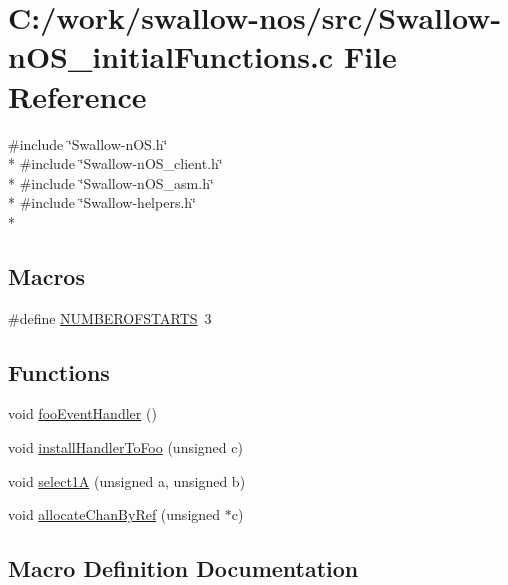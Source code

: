 \hypertarget{_swallow-n_o_s__initial_functions_8c}{}\section{C\+:/work/swallow-\/nos/src/\+Swallow-\/n\+O\+S\+\_\+initial\+Functions.c File Reference}
\label{_swallow-n_o_s__initial_functions_8c}
{\ttfamily \#include \char`\"{}Swallow-\/n\+O\+S.\+h\char`\"{}}\\*
{\ttfamily \#include \char`\"{}Swallow-\/n\+O\+S\+\_\+client.\+h\char`\"{}}\\*
{\ttfamily \#include \char`\"{}Swallow-\/n\+O\+S\+\_\+asm.\+h\char`\"{}}\\*
{\ttfamily \#include \char`\"{}Swallow-\/helpers.\+h\char`\"{}}\\*
\subsection*{Macros}
\begin{DoxyCompactItemize}
\item 
\#define \hyperlink{_swallow-n_o_s__initial_functions_8c_a165864210739b81bb5fe3fdd0e425c31}{N\+U\+M\+B\+E\+R\+O\+F\+S\+T\+A\+R\+T\+S}~3
\end{DoxyCompactItemize}
\subsection*{Functions}
\begin{DoxyCompactItemize}
\item 
void \hyperlink{_swallow-n_o_s__initial_functions_8c_a30c5c6be8221be98db48fc2bc37fe946}{foo\+Event\+Handler} ()
\item 
void \hyperlink{_swallow-n_o_s__initial_functions_8c_aead9fdd5dce4227d9284ed2650666233}{install\+Handler\+To\+Foo} (unsigned c)
\item 
void \hyperlink{_swallow-n_o_s__initial_functions_8c_ad9abbfd22153e149a6d9008f83b272b0}{select1\+A} (unsigned a, unsigned b)
\item 
void \hyperlink{_swallow-n_o_s__initial_functions_8c_a5f5240e7f89a0f0e840aaeb26b669eed}{allocate\+Chan\+By\+Ref} (unsigned $\ast$c)
\end{DoxyCompactItemize}


\subsection{Macro Definition Documentation}
\hypertarget{_swallow-n_o_s__initial_functions_8c_a165864210739b81bb5fe3fdd0e425c31}{}
